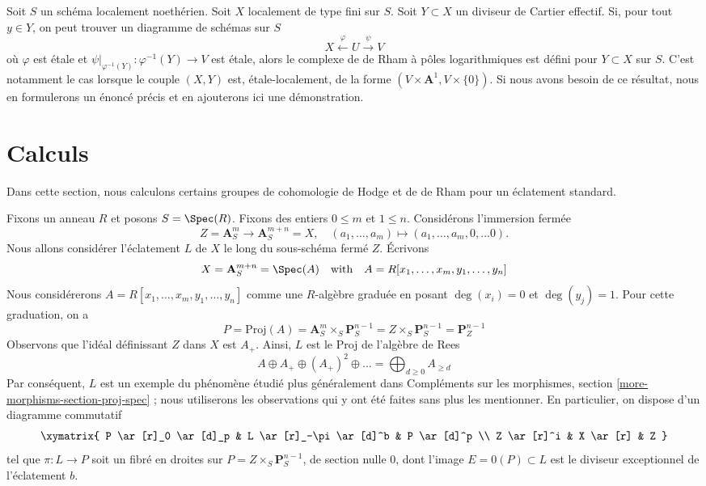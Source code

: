 \begin{remark}
\label{remark-check-log-completion-2}
Soit $S$ un schéma localement noethérien. Soit $X$ localement de type
fini sur $S$. Soit $Y \subset X$ un diviseur de Cartier effectif.
Si, pour tout $y \in Y$, on peut trouver un diagramme de schémas sur $S$
$$
X \xleftarrow{\varphi} U \xrightarrow{\psi} V
$$
où $\varphi$ est étale et $\psi|_{\varphi^{-1}(Y)} : \varphi^{-1}(Y) \to V$
est étale, alors le complexe de de Rham à pôles logarithmiques est défini pour
$Y \subset X$ sur $S$. C'est notamment le cas lorsque le couple $(X, Y)$
est, étale-localement, de la forme $(V \times \mathbf{A}^1, V \times \{0\})$.
Si nous avons besoin de ce résultat, nous en formulerons
un énoncé précis et en ajouterons ici une démonstration.
\end{remark}

















\section{Calculs}
\label{section-calculations}

\noindent
Dans cette section, nous calculons certains groupes de cohomologie de Hodge
et de de Rham pour un éclatement standard.

\medskip\noindent
Fixons un anneau $R$ et posons $S = \Spec(R)$. Fixons des entiers $0 \leq m$ et
$1 \leq n$. Considérons l'immersion fermée
$$
Z = \mathbf{A}^m_S \longrightarrow \mathbf{A}^{m + n}_S = X,\quad
(a_1, \ldots, a_m) \mapsto (a_1, \ldots, a_m, 0, \ldots 0).
$$
Nous allons considérer l'éclatement $L$ de $X$
le long du sous-schéma fermé $Z$. Écrivons
$$
X =
\mathbf{A}^{m + n}_S =
\Spec(A)
\quad\text{with}\quad
A = R[x_1, \ldots, x_m, y_1, \ldots, y_n]
$$
Nous considérerons $A = R[x_1, \ldots, x_m, y_1, \ldots, y_n]$ comme une
$R$-algèbre graduée en posant $\deg(x_i) = 0$ et $\deg(y_j) = 1$.
Pour cette graduation, on a
$$
P =
\text{Proj}(A) =
\mathbf{A}^m_S \times_S \mathbf{P}^{n - 1}_S =
Z \times_S \mathbf{P}^{n - 1}_S =
\mathbf{P}^{n - 1}_Z
$$
Observons que l'idéal définissant $Z$ dans $X$ est $A_+$.
Ainsi, $L$ est le Proj de l'algèbre de Rees
$$
A \oplus A_+ \oplus (A_+)^2 \oplus \ldots =
\bigoplus\nolimits_{d \geq 0} A_{\geq d}
$$
Par conséquent, $L$ est un exemple du phénomène étudié
plus généralement dans Compléments sur les morphismes, section
\ref{more-morphisms-section-proj-spec} ;
nous utiliserons les observations qui y ont été faites sans plus les mentionner.
En particulier, on dispose d'un diagramme commutatif
$$
\xymatrix{
P \ar[r]_0 \ar[d]_p &
L \ar[r]_-\pi \ar[d]^b &
P \ar[d]^p \\
Z \ar[r]^i &
X \ar[r] &
Z
}
$$
tel que $\pi : L \to P$ soit un fibré en droites sur
$P = Z \times_S \mathbf{P}^{n - 1}_S$,
de section nulle $0$, dont l'image $E = 0(P) \subset L$
est le diviseur exceptionnel de l'éclatement $b$.

